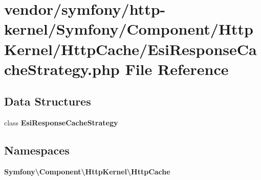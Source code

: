 \section{vendor/symfony/http-\/kernel/\+Symfony/\+Component/\+Http\+Kernel/\+Http\+Cache/\+Esi\+Response\+Cache\+Strategy.php File Reference}
\label{_esi_response_cache_strategy_8php}
\subsection*{Data Structures}
\begin{DoxyCompactItemize}
\item 
class {\bf Esi\+Response\+Cache\+Strategy}
\end{DoxyCompactItemize}
\subsection*{Namespaces}
\begin{DoxyCompactItemize}
\item 
 {\bf Symfony\textbackslash{}\+Component\textbackslash{}\+Http\+Kernel\textbackslash{}\+Http\+Cache}
\end{DoxyCompactItemize}
